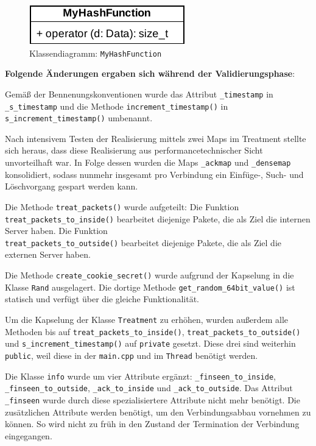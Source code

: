 \documentclass[../review_3.tex]{subfiles}
\begin{document}
\begin{figure}[h]
    \centering
    \includegraphics[width=0.3\linewidth]{img/MyHashFunction.pdf}
    \caption{Klassendiagramm: \texttt{MyHashFunction}}
    \label{MyHashFunction}
\end{figure}

\textbf{Folgende Änderungen ergaben sich während der Validierungsphase}:

Gemäß der Bennenungskonventionen wurde das Attribut \texttt{\_timestamp} in \texttt{\_s\_timestamp} und die Methode \texttt{increment\_timestamp()} in \texttt{s\_increment\_timestamp()} umbenannt.

Nach intensivem Testen der Realisierung mittels zwei Maps im Treatment stellte sich heraus, dass diese Realisierung aus performancetechnischer Sicht unvorteilhaft war. In Folge dessen wurden die Maps \texttt{\_ackmap} und \texttt{\_densemap} konsolidiert, sodass nunmehr insgesamt pro Verbindung ein Einfüge-, Such- und Löschvorgang gespart werden kann.

Die Methode \texttt{treat\_packets()} wurde aufgeteilt: Die Funktion \texttt{treat\_packets\_to\_inside()} bearbeitet diejenige Pakete, die als Ziel die internen Server haben. Die Funktion \\ \texttt{treat\_packets\_to\_outside()} bearbeitet diejenige Pakete, die als Ziel die externen Server haben.

Die Methode \texttt{create\_cookie\_secret()} wurde aufgrund der Kapselung in die Klasse \texttt{Rand} ausgelagert. Die dortige Methode \texttt{get\_random\_64bit\_value()} ist statisch und verfügt über die gleiche Funktionalität.

Um die Kapselung der Klasse \texttt{Treatment} zu erhöhen, wurden außerdem alle Methoden bis auf \texttt{treat\_packets\_to\_inside()}, \texttt{treat\_packets\_to\_outside()} und \texttt{s\_increment\_timestamp()} auf \texttt{private} gesetzt. Diese drei sind weiterhin \texttt{public}, weil diese in der \texttt{main.cpp} und im \texttt{Thread} benötigt werden.

Die Klasse \texttt{info} wurde um vier Attribute ergänzt: \texttt{\_finseen\_to\_inside}, \texttt{\_finseen\_to\_outside}, \texttt{\_ack\_to\_inside} und  \texttt{\_ack\_to\_outside}. Das Attribut \texttt{\_finseen} wurde durch diese spezialisiertere Attribute nicht mehr benötigt. 
Die zusätzlichen Attribute werden benötigt, um den Verbindungsabbau vornehmen zu können. So wird nicht zu früh in den Zustand der Termination der Verbindung eingegangen.
\end{document}
